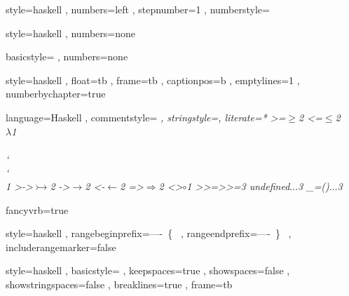 \usepackage{xcolor}
\usepackage{fancyvrb}
\usepackage[scaled]{beramono}


    { style=haskell
    , numbers=left
    , stepnumber=1
    , numberstyle=\tiny
    }

    { style=haskell
    , numbers=none
    }

    {
    }

    { basicstyle=\color{red}\ttfamily
    , numbers=none
    }

    { style=haskell
    , float=tb
    , frame=tb
    , captionpos=b
    , emptylines=1
    , numberbychapter=true
    }

    { language=Haskell
    , commentstyle=\color[rgb]{0.38,0.63,0.69}\itshape
    , stringstyle=\textcolor[rgb]{0.25,0.44,0.63}
    , literate=*
        {>=}{{$\geq$}}2
        {<=}{{$\leq$}}2
        {\\}{{$\lambda$}}1
        {\\\\}{{\char`\\\char`\\}}1
        {>->}{{$\rightarrowtail$}}2
        {->}{{$\rightarrow$}}2
        {<-}{{$\leftarrow$}}2
        {=>}{{$\Rightarrow$}}2
        {<>}{{$\circ$}}1
        {>>=}{{>>=}}3
        {undefined}{{$\ldots$}}3
        {_=()}{{$\ldots$}}3
    }

    { fancyvrb=true
    }

    { style=haskell
    , rangebeginprefix=----\ \{\ %
    , rangeendprefix=----\ \}\ %
    , includerangemarker=false
    }

\lstset
    { style=haskell
    , basicstyle=\fontsize{8}{10}\ttfamily
    , keepspaces=true
    , showspaces=false
    , showstringspaces=false
    , breaklines=true
    , frame=tb
    }
\lstset{ style=numbers
       , captionpos=b
       }

